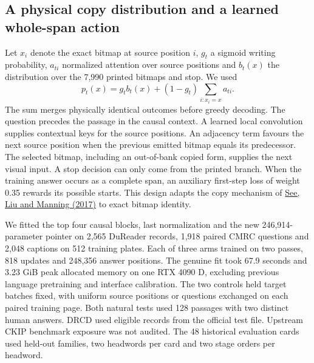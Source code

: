 \documentclass[12pt,a4paper]{article}
\providecommand{\DIFadd}[1]{{\protect\color{blue} \sf #1}} %
\begin{document}
\subsection*{\DIFadd{A physical copy distribution and a learned whole-span action}}
\DIFadd{Let $x_i$ denote the exact bitmap at source position $i$, $g_t$ a sigmoid writing probability, $a_{ti}$ normalized attention over source positions and $b_t(x)$ the distribution over the 7,990 printed bitmaps and stop. We used
}\[
  p_t(x)=g_t b_t(x)+(1-g_t)\sum_{i:x_i=x}a_{ti}.
\]
\DIFadd{The sum merges physically identical outcomes before greedy decoding. The question precedes the passage in the causal context. A learned local convolution supplies contextual keys for the source positions. An adjacency term favours the next source position when the previous emitted bitmap equals its predecessor. The selected bitmap, including an out-of-bank copied form, supplies the next visual input. A stop decision can only come from the printed branch. When the training answer occurs as a complete span, an auxiliary first-step loss of weight 0.35 rewards its possible starts. This design adapts the copy mechanism of }\href{https://aclanthology.org/P17-1099/}{\DIFadd{See, Liu and Manning (2017)}} \DIFadd{to exact bitmap identity.
}

\DIFadd{We fitted the top four causal blocks, last normalization and the new 246,914-parameter pointer on 2,565 DuReader records, 1,918 paired CMRC questions and 2,048 captions on 512 training plates. Each of three arms trained on two passes, 818 updates and 248,356 answer positions. The genuine fit took 67.9 seconds and 3.23 GiB peak allocated memory on one RTX 4090 D, excluding previous language pretraining and interface calibration. The two controls held target batches fixed, with uniform source positions or questions exchanged on each paired training page. Both natural tests used 128 passages with two distinct human answers. DRCD used eligible records from the official test file. Upstream CKIP benchmark exposure was not audited. The 48 historical evaluation cards used held-out families, two headwords per card and two stage orders per headword.
}
\end{document}
